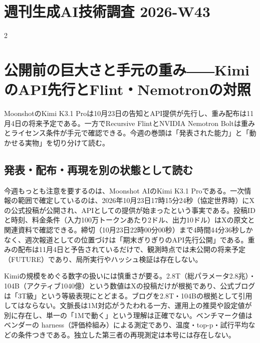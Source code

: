 \documentclass[lualatex,a4paper,10pt]{jlreq}
\begin{document}
\surveycover
\clearpage
\tableofcontents
\clearpage

\section*{週刊生成AI技術調査 2026-W43}
\label{sec:cover-title}
\begin{multicols}{2} %


\section{公開前の巨大さと手元の重み――KimiのAPI先行とFlint・Nemotronの対照}
\label{sec:P1}


MoonshotのKimi K3.1 Proは10月23日の告知とAPI提供が先行し、重み配布は11月4日の将来予定である。一方でRecursive FlintとNVIDIA Nemotron Boltは重みとライセンス条件が手元で確認できる。今週の巻頭は「発表された能力」と「動かせる実物」を切り分けて読む。


\subsection*{発表・配布・再現を別の状態として読む}


今週もっとも注意を要するのは、Moonshot AIのKimi K3.1 Proである。一次情報の範囲で確定しているのは、2026年10月23日17時15分24秒（協定世界時）にXの公式投稿が公開され、APIとしての提供が始まったという事実である。投稿IDと時刻、料金条件（入力100万トークンあたり2ドル、出力10ドル）はXの原文と関連資料で確認できる。締切（10月23日22時00分00秒）まで4時間44分36秒しかなく、週次報道としての位置づけは「期末ぎりぎりのAPI先行公開」である。重みの配布は11月4日と予告されているだけで、観測時点では未公開の将来予定（FUTURE）であり、局所実行やハッシュ検証は存在しない。


Kimiの規模をめぐる数字の扱いには慎重さが要る。2.8T（総パラメータ2.8兆）・104B（アクティブ1040億）という数値はXの投稿だけが根拠であり、公式ブログは「3T級」という等級表現にとどまる。ブログを2.8T・104Bの根拠として引用してはならない。文脈長は1M対応がうたわれる一方、運用上の推奨や設定値が別に存在し、単一の「1Mで動く」という理解は正確でない。ベンチマーク値はベンダーの harness（評価枠組み）による測定であり、温度・top-p・試行平均などの条件つきである。独立した第三者の再現測定は本号には存在しない。


\end{multicols} %
\end{document}

